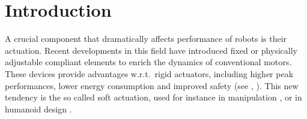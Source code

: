 \section{Introduction}
\label{sec:introduction}

A crucial component that dramatically affects performance of robots is their actuation. Recent developments in this field have introduced fixed or physically adjustable compliant elements to enrich the dynamics of conventional motors. %
These devices provide advantages w.r.t.~rigid actuators, including higher peak performances, lower energy consumption and improved safety (see \cite{Pratt95,VanderborghtVHDLDB06,CGGBMTB11}, \cite{Taylor:2011}). This new tendency is the so called soft actuation, used for instance in manipulation \cite{SoftRoboticsDLR08}, or in humanoid design \cite{TsLaVaCa09}.

